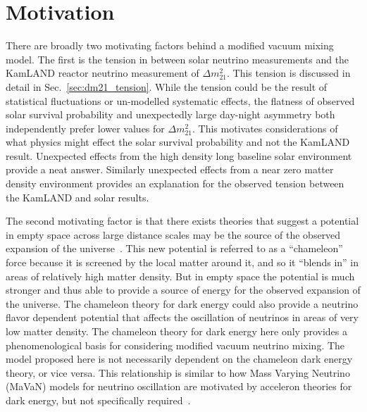 \section{Motivation}
\label{sec:motivations}
There are broadly two motivating factors behind a modified vacuum mixing model.
The first is the tension in between solar neutrino measurements and 
the KamLAND reactor neutrino measurement of $\Delta m^{2}_{21}$.
This tension is discussed in detail in Sec.~\ref{sec:dm21_tension}.
While the tension could be the result of statistical fluctuations or un-modelled
systematic effects, the flatness of observed solar survival probability and
unexpectedly large day-night asymmetry both independently prefer lower values
for $\Delta m^{2}_{21}$.
This motivates considerations of what physics might effect the solar survival
probability and not the KamLAND result.
Unexpected effects from the high density long baseline solar environment provide a neat answer.
Similarly unexpected effects from a near zero matter density environment
provides an explanation for the observed tension between the KamLAND and solar
results.

The second motivating factor is that there exists theories that
suggest a potential in empty space across large distance scales may be the source
of the observed expansion of the universe~\cite{khoury_chameleons}.
This new potential is referred to as a ``chameleon'' force because it
is screened by the local matter around it, and so it ``blends in'' in
areas of relatively high matter density.
But in empty space the potential is much stronger and thus able to provide
a source of energy for the observed expansion of the universe.
The chameleon theory for dark energy could also provide a neutrino flavor dependent
potential that affects the oscillation of neutrinos in areas of very low matter
density.
The chameleon theory for dark energy here only provides a phenomenological basis
for considering modified vacuum neutrino mixing. The model proposed here is
not necessarily dependent on the chameleon dark energy theory, or vice versa.
This relationship is similar to how Mass Varying Neutrino (MaVaN) models
for neutrino oscillation are motivated by acceleron theories for dark energy,
but not specifically required~\cite{mavans_cosmology}.


